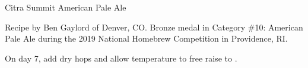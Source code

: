 \begin{recipe}{Citra Summit American Pale Ale}

\begin{aboutblock}
Recipe by Ben Gaylord of Denver, CO. Bronze medal in Category \#10: American Pale
Ale during the 2019 National Homebrew Competition in Providence, RI.
\sourceaha
\end{aboutblock}


\begin{methodandtiming}
 
\begin{mashsteps}
\end{mashsteps}

\begin{fermentationsteps}
\end{fermentationsteps}

\begin{directions}
On day 7, add dry hops and allow temperature to free raise to .
\end{directions}

\end{methodandtiming}

\recipebreak

\begin{ingredientsblock}

\begin{malts}
\end{malts}

\begin{hops}
\end{hops}


\end{ingredientsblock}

\end{recipe}

